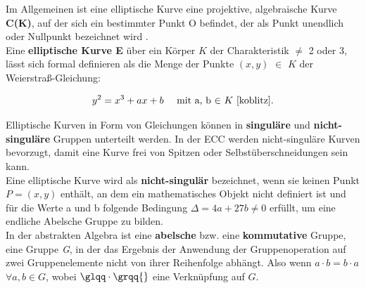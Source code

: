 Im Allgemeinen ist eine elliptische Kurve eine projektive, algebraische Kurve \textbf{C(K)}, auf der sich ein bestimmter Punkt O befindet, der als Punkt unendlich oder Nullpunkt bezeichnet wird \cite{GaMoDa}.\\

Eine \textbf{elliptische Kurve E} über ein Körper $ K $ der Charakteristik $ \neq $
2 oder 3, lässt sich formal definieren als die Menge der Punkte
$ (x, y) $ $ \in $ \( K \)  der Weierstraß-Gleichung:

\begin{ceqn}

\begin{equation}
       y^2 = x^3 + ax + b \quad 
       \text{ mit a, b $ \in $ $ K $           \cite{koblitz}.}
\end{equation} 

\end{ceqn}

Elliptische Kurven in Form von Gleichungen können in \textbf{singuläre} und \textbf{nicht-singuläre} Gruppen unterteilt werden. In der ECC werden nicht-singuläre Kurven bevorzugt, damit eine Kurve frei von Spitzen oder Selbstüberschneidungen sein kann\cite{razad}.\\

Eine elliptische Kurve wird als \textbf{nicht-singulär} bezeichnet,
wenn sie keinen Punkt $ P = (x, y) $ enthält, an dem ein
mathematisches Objekt nicht definiert ist \cite{werner} und für
die Werte a und b folgende Bedingung $ \Delta = 4a + 27b \neq 0
$ erfüllt, um eine endliche Abelsche Gruppe zu bilden.\\

In der abstrakten Algebra ist eine \textbf{abelsche} bzw. eine
\textbf{kommutative} Gruppe, eine Gruppe \textit{G}, in der das
Ergebnis der Anwendung der Gruppenoperation auf zwei
Gruppenelemente nicht von ihrer Reihenfolge abhängt. Also wenn \(a \cdot b = b \cdot a\) \quad \(\forall a, b \in \textit{G}\), wobei \(\glqq \cdot \grqq{}\) eine Verknüpfung auf $\textit{G}$.\\

